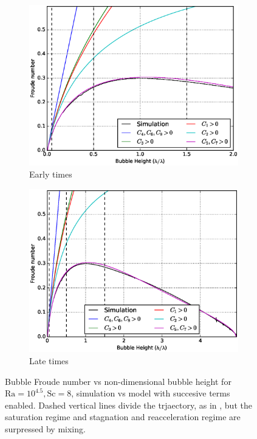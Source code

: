 \begin{figure}
\begin{subfigure}[b]{\columnwidth}
\includegraphics[width=\columnwidth]{figs/Cascade-short-32-4}
\caption{Early times}
\end{subfigure}
\begin{subfigure}[b]{\columnwidth}
\includegraphics[width=\columnwidth]{figs/Cascade-32-4}
\caption{Late times}
\end{subfigure}
\caption{ 
Bubble Froude number vs non-dimensional bubble height for $\text{Ra} = 10^{4.5}, \text{Sc} = 8$, simulation vs model with succesive terms enabled.
Dashed vertical lines divide the trjaectory, as in , but the saturation regime and stagnation and reacceleration regime are surpressed by mixing.
}
\end{figure}

